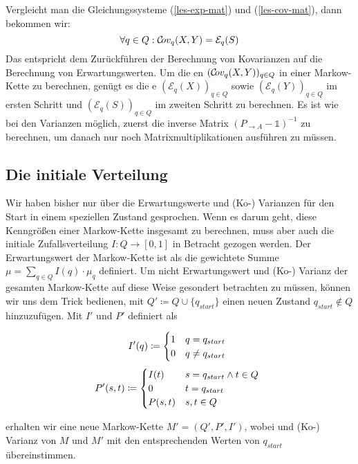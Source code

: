 \documentclass[a4paper]{article}
\newcommand{\mc}{Markow-Kette}
\theoremstyle{nonumberplain}
\begin{document}
	Vergleicht man die Gleichungssysteme (\ref{les-exp-mat}) und (\ref{les-cov-mat}), dann bekommen wir:
	\begin{equation}
	\forall q \in Q : \mathcal{C}\!ov_q(X,Y) = \mathcal{E}_q(S)
	\end{equation}
	Das entspricht dem Zurückführen der Berechnung von Kovarianzen auf die Berechnung von Erwartungswerten. Um die \cov{}en $(\mathcal{C}\!ov_q(X,Y))_{q\in Q}$ in einer \mc{} zu berechnen, genügt es die \expect{}e $(\mathcal{E}_q(X))_{q\in Q}$ sowie $(\mathcal{E}_q(Y))_{q\in Q}$ im ersten Schritt und $(\mathcal{E}_q(S))_{q\in Q}$ im zweiten Schritt zu berechnen. Es ist wie bei den Varianzen möglich, zuerst die inverse Matrix $(P_{\rightarrow A} - \mathbb{1})^{-1}$ zu berechnen, um danach nur noch Matrixmultiplikationen ausführen zu müssen.
	
	\subsection{Die initiale Verteilung}
	
	Wir haben bisher nur über die Erwartungswerte und (Ko-) Varianzen für den Start in einem speziellen Zustand gesprochen. Wenn es darum geht, diese Kenngrößen einer \mc{} \mcex{} insgesamt zu berechnen, muss aber auch die initiale Zufallsverteilung $I : Q \to [0,1]$ in Betracht gezogen werden. Der Erwartungswert der \mc{} ist als die gewichtete Summe $\mu = \sum_{q\in Q}{I(q) \cdot \mu_q}$ definiert. Um nicht Erwartungswert und (Ko-) Varianz der gesamten \mc{} auf diese Weise gesondert betrachten zu müssen, können wir uns dem Trick bedienen, mit $Q' \coloneqq Q \cup \{q_{start}\}$ einen neuen Zustand $q_{start} \notin Q$ hinzuzufügen. Mit $I'$ und $P'$ definiert als
	\begin{multicols}{2}
		\noindent
		\begin{equation*}
		\hspace{-1ex}I'(q) \coloneqq \begin{cases}
		1 & q = q_{start}\\
		0 & q \neq q_{start}
		
		\end{cases}
		\end{equation*}
		\begin{equation*}
		\hspace{-1ex}P'(s, t)  \coloneqq \begin{cases}
		I(t) & s = q_{start} \land t \in Q \\
		0 & t = q_{start}\\
		P(s,t) & s,t \in Q
		\end{cases}
		\end{equation*}
	\end{multicols}
	erhalten wir eine neue \mc{} $M'=(Q',P',I')$, wobei \expect{} und (Ko-) Varianz von $M$ und $M'$ mit den entsprechenden Werten von $q_{start}$ übereinstimmen.
	
\end{document}
